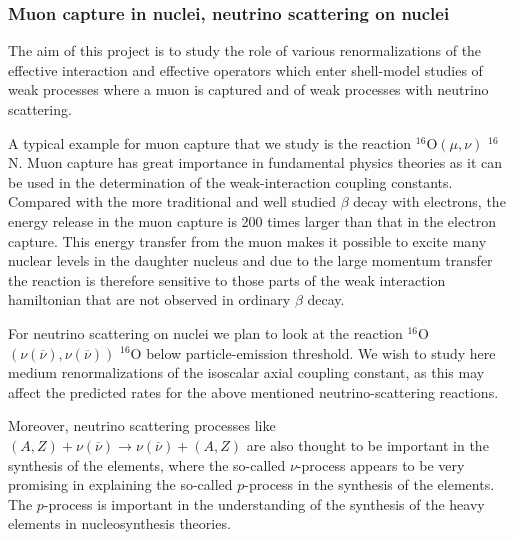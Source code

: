 \subsubsection{Muon capture in nuclei,  
neutrino scattering on nuclei}

The aim of this project is to study the role of 
various renormalizations of the effective interaction
and effective operators which enter shell-model studies
of weak processes
where a muon is captured and 
of weak processes with neutrino scattering. 

A typical example for muon capture that we study
is the reaction $^{16}$O$(\mu , \nu)$ $^{16}$N.
Muon capture has great importance in fundamental
physics theories as it can be used in the determination
of the weak-interaction coupling constants.
Compared with the more traditional and well studied
$\beta$ decay with electrons, the energy release in the muon
capture is 200 times larger than that in the electron
capture. This energy transfer from the muon makes 
it possible to excite many nuclear levels in the daughter
nucleus and due to the large momentum transfer the reaction is 
therefore sensitive to those
parts of the weak interaction hamiltonian that are 
not observed in ordinary $\beta$ decay. 


For neutrino scattering on nuclei we plan to look at 
the reaction $^{16}$O$(\nu(\overline{\nu}) ,\nu(\overline{\nu}))$ $^{16}$O 
below particle-emission threshold.
We wish to study here medium renormalizations of the isoscalar axial
coupling constant, as this may affect the predicted 
rates for the above mentioned neutrino-scattering reactions.

Moreover, neutrino scattering processes like  
$(A,Z)+\nu(\overline{\nu}) \rightarrow 
\nu(\overline{\nu}) +(A,Z)$ are also thought to be important
in the synthesis of the elements, where the so-called 
$\nu$-process appears to be very promising in explaining
the so-called $p$-process in the synthesis of the elements.
The $p$-process is important in the understanding 
of the synthesis of the heavy elements in nucleosynthesis
theories.

